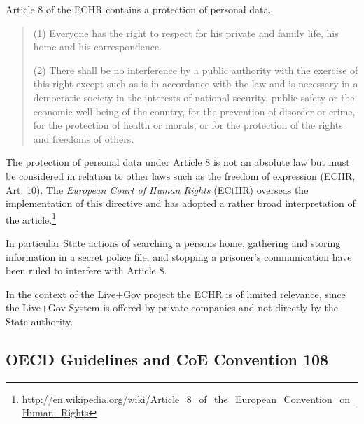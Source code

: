 Article 8 of the ECHR contains a protection of personal data.

\begin{quote}
(1) Everyone has the right to respect for his private and family life, his home and his correspondence.

(2) There shall be no interference by a public authority with the exercise of this right except such as is in accordance with the law and is necessary in a democratic society in the interests of national security, public safety or the economic well-being of the country, for the prevention of disorder or crime, for the protection of health or morals, or for the protection of the rights and freedoms of others.
\end{quote}

The protection of personal data under Article 8 is not an absolute law but must be considered in relation to other laws such as the freedom of expression (ECHR, Art. 10).
The \emph{European Court of Human Rights} (ECtHR) overseas the implementation of this directive and has adopted a rather broad interpretation of the article.\footnote{\url{http://en.wikipedia.org/wiki/Article_8_of_the_European_Convention_on_Human_Rights}}

In particular State actions of searching a persons home, gathering and storing information in a secret police file, and stopping a prisoner's communication have been ruled to interfere with Article 8.

In the context of the Live+Gov project the ECHR is of limited relevance, since the Live+Gov System is offered by private companies and not directly by the State authority.

\subsection{OECD Guidelines and CoE Convention 108}

